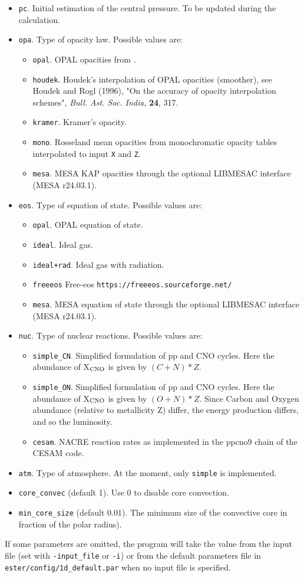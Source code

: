 \begin{itemize}
\item {\tt pc}. Initial estimation of the central pressure. To be updated during the
calculation.
\item {\tt opa}. Type of opacity law. Possible values are:
\begin{itemize}
\item {\tt opal}. OPAL opacities from \cite{GN93}.
\item {\tt houdek}. Houdek's interpolation of OPAL opacities (smoother),
see Houdek and Rogl (1996), "On the accuracy of opacity interpolation
schemes", {\it Bull. Ast. Soc. India}, {\bf 24}, 317.
\item {\tt kramer}. Kramer's opacity.
\item {\tt mono}. Rosseland mean opacities from monochromatic opacity tables \citep{Mombarg2022} interpolated to input {\tt X} and {\tt Z}. 
\item {\tt mesa}. MESA KAP opacities through the optional LIBMESAC
interface (MESA r24.03.1).
\end{itemize}
\item {\tt eos}. Type of equation of state. Possible values are:
\begin{itemize}
\item {\tt opal}. OPAL equation of state.
\item {\tt ideal}. Ideal gas.
\item {\tt ideal+rad}. Ideal gas with radiation.
\item {\tt freeeos} Free-eos  {\tt https://freeeos.sourceforge.net/}
\item {\tt mesa}. MESA equation of state through the optional LIBMESAC
interface (MESA r24.03.1).
\end{itemize}
\item {\tt nuc}. Type of nuclear reactions. Possible values are:
\begin{itemize}
\item {\tt simple\_CN}. Simplified formulation of pp and CNO cycles.
Here the abundance of X$_{\rm CNO}$ is given by $(C+N)*Z$.
\item {\tt simple\_ON}. Simplified formulation of pp and CNO cycles. 
Here the abundance of X$_{\rm CNO}$ is given by $(O+N)*Z$. Since Carbon
and Oxygen abundance (relative to metallicity Z) differ, the energy
production differs, and so the luminosity.
\item {\tt cesam}. NACRE reaction rates as implemented in the ppcno9 chain of the CESAM code.
\end{itemize}
\item {\tt atm}. Type of atmosphere. At the moment, only {\tt simple} is implemented.
\item {\tt core\_convec} (default 1). Use 0 to disable core convection.
\item {\tt min\_core\_size} (default 0.01). The minimum size of the convective core
in fraction of the polar radius).
\end{itemize}
If some parameters are omitted, the program will take the value from the input file (set with
{\tt -input\_file} or {\tt -i}) or from the default parameters file in 
{\tt ester/config/1d\_default.par} when no input file is specified.

